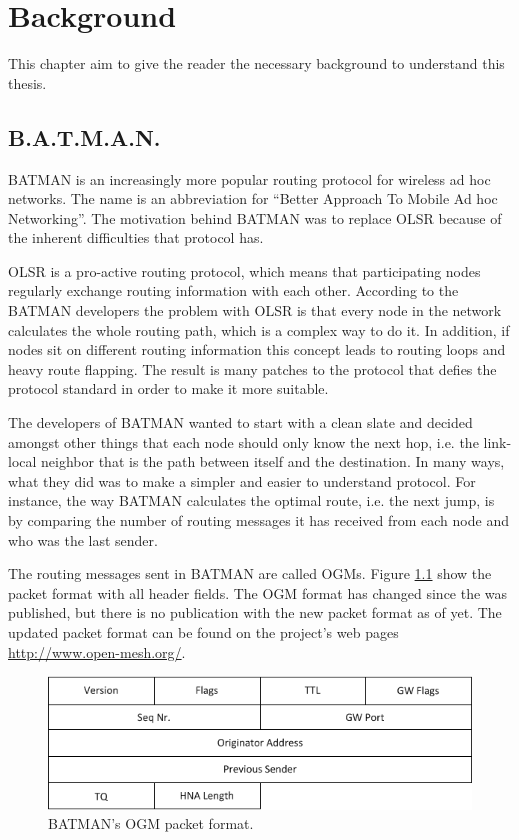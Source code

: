 \chapter{Background}
This chapter aim to give the reader the necessary background to understand this
thesis.

\section{B.A.T.M.A.N.}
BATMAN \cite{batman_rfc} is an increasingly more popular routing protocol for
wireless ad hoc networks. The name is an abbreviation for ``Better Approach To
Mobile Ad hoc Networking''. The motivation behind BATMAN was to replace OLSR
\cite{why-starting-batman} because of the inherent difficulties that protocol
has. 

OLSR is a pro-active routing protocol, which means that participating nodes
regularly exchange routing information with each other. According to the BATMAN
developers the problem with OLSR is that every node in the network calculates
the whole routing path, which is a complex way to do it. In addition, if nodes
sit on different routing information this concept leads to routing loops and
heavy route flapping. The result is many patches to the protocol that defies
the protocol standard in order to make it more suitable.

The developers of BATMAN wanted to start with a clean slate and decided amongst
other things that each node should only know the next hop, i.e. the link-local
neighbor that is the path between itself and the destination. In many ways, what
they did was to make a simpler and easier to understand protocol. For instance,
the way BATMAN calculates the optimal route, i.e. the next jump, is by comparing
the number of routing messages it has received from each node and who was the
last sender.

The routing messages sent in BATMAN are called \acp{OGM}. Figure
\ref{fig:original_ogm} show the packet format with all header fields. The
\ac{OGM} format has changed since the \cite{batman_rfc} was published, but there
is no publication with the new packet format as of yet. The updated packet
format can be found on the project's web pages \url{http://www.open-mesh.org/}.

\begin{figure}[ht!]
	\centering
  	\includegraphics{images/original_ogm.png}
  	\caption{BATMAN's \acf{OGM} packet format.}
	\label{fig:original_ogm}
\end{figure}

